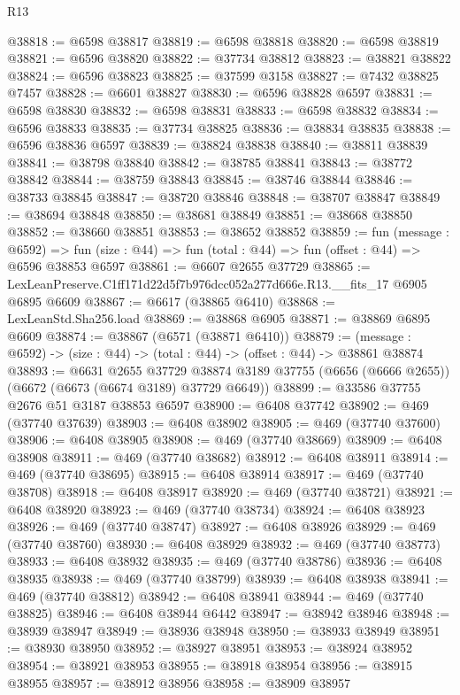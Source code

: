 \begin{lexlean}{R13}
\begin{coremodule}
@38818 := @6598 @38817
@38819 := @6598 @38818
@38820 := @6598 @38819
@38821 := @6596 @38820
@38822 := @37734 @38812
@38823 := @38821 @38822
@38824 := @6596 @38823
@38825 := @37599 @3158
@38827 := @7432 @38825 @7457
@38828 := @6601 @38827
@38830 := @6596 @38828 @6597
@38831 := @6598 @38830
@38832 := @6598 @38831
@38833 := @6598 @38832
@38834 := @6596 @38833
@38835 := @37734 @38825
@38836 := @38834 @38835
@38838 := @6596 @38836 @6597
@38839 := @38824 @38838
@38840 := @38811 @38839
@38841 := @38798 @38840
@38842 := @38785 @38841
@38843 := @38772 @38842
@38844 := @38759 @38843
@38845 := @38746 @38844
@38846 := @38733 @38845
@38847 := @38720 @38846
@38848 := @38707 @38847
@38849 := @38694 @38848
@38850 := @38681 @38849
@38851 := @38668 @38850
@38852 := @38660 @38851
@38853 := @38652 @38852
@38859 := fun (message : @6592) =>
  fun (size : @44) => fun (total : @44) => fun (offset : @44) => @6596 @38853 @6597
@38861 := @6607 @2655 @37729
@38865 := LexLeanPreserve.C1ff171d22d5f7b976dcc052a277d666e.R13.__fits_17 @6905 @6895 @6609
@38867 := @6617 (@38865 @6410)
@38868 := LexLeanStd.Sha256.load
@38869 := @38868 @6905
@38871 := @38869 @6895 @6609
@38874 := @38867 (@6571 (@38871 @6410))
@38879 := (message : @6592) -> (size : @44) -> (total : @44) -> (offset : @44) -> @38861 @38874
@38893 := @6631
    @2655
    @37729
    @38874
    @3189
    @37755
    (@6656 (@6666 @2655))
    (@6672 (@6673 (@6674 @3189) @37729 @6649))
@38899 := @33586 @37755 @2676 @51 @3187 @38853 @6597
@38900 := @6408 @37742
@38902 := @469 (@37740 @37639)
@38903 := @6408 @38902
@38905 := @469 (@37740 @37600)
@38906 := @6408 @38905
@38908 := @469 (@37740 @38669)
@38909 := @6408 @38908
@38911 := @469 (@37740 @38682)
@38912 := @6408 @38911
@38914 := @469 (@37740 @38695)
@38915 := @6408 @38914
@38917 := @469 (@37740 @38708)
@38918 := @6408 @38917
@38920 := @469 (@37740 @38721)
@38921 := @6408 @38920
@38923 := @469 (@37740 @38734)
@38924 := @6408 @38923
@38926 := @469 (@37740 @38747)
@38927 := @6408 @38926
@38929 := @469 (@37740 @38760)
@38930 := @6408 @38929
@38932 := @469 (@37740 @38773)
@38933 := @6408 @38932
@38935 := @469 (@37740 @38786)
@38936 := @6408 @38935
@38938 := @469 (@37740 @38799)
@38939 := @6408 @38938
@38941 := @469 (@37740 @38812)
@38942 := @6408 @38941
@38944 := @469 (@37740 @38825)
@38946 := @6408 @38944 @6442
@38947 := @38942 @38946
@38948 := @38939 @38947
@38949 := @38936 @38948
@38950 := @38933 @38949
@38951 := @38930 @38950
@38952 := @38927 @38951
@38953 := @38924 @38952
@38954 := @38921 @38953
@38955 := @38918 @38954
@38956 := @38915 @38955
@38957 := @38912 @38956
@38958 := @38909 @38957

\end{coremodule}
\end{lexlean}
